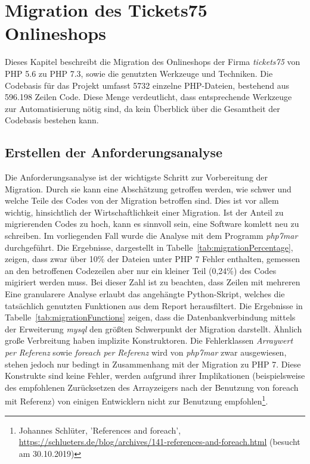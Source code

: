 \chapter{Migration des Tickets75 Onlineshops}\label{ch:migration} 

Dieses Kapitel beschreibt die Migration des Onlineshops der Firma \textit{tickets75} von \ac{PHP} 5.6 zu \ac{PHP} 7.3, sowie die 
genutzten Werkzeuge und Techniken. Die Codebasis 
für das Projekt umfasst 5732 einzelne \ac{PHP}-Dateien, bestehend aus 596.198 Zeilen Code. Diese Menge verdeutlicht, dass 
entsprechende Werkzeuge zur Automatisierung nötig sind, da kein Überblick über die Gesamtheit der Codebasis bestehen kann.

\section{Erstellen der Anforderungsanalyse}\label{analyze}
Die Anforderungsanalyse ist der wichtigste Schritt zur Vorbereitung der Migration. Durch sie kann eine Abschätzung getroffen werden, 
wie schwer und welche Teile des Codes von der Migration betroffen sind. Dies ist vor allem wichtig, hinsichtlich der 
Wirtschaftlichkeit einer Migration. Ist der Anteil zu migrierenden Codes zu hoch, kann es sinnvoll sein, eine Software 
komlett neu zu schreiben. Im vorliegenden Fall wurde die Analyse mit dem Programm \textit{php7mar} durchgeführt.
Die Ergebnisse, dargestellt in Tabelle~\ref{tab:migrationPercentage}, zeigen, dass zwar über 10\% der Dateien unter \ac{PHP} 7 
Fehler enthalten, gemessen an den betroffenen Codezeilen aber nur ein kleiner Teil (0,24\%) des Codes migiriert werden muss.
Bei dieser Zahl ist zu beachten, dass Zeilen mit mehreren 
Eine granularere Analyse erlaubt das angehängte Python-Skript, welches die tatsächlich genutzten Funktionen aus dem Report 
herausfiltert. Die Ergebnisse in Tabelle~\ref{tab:migrationFunctions} zeigen, dass die Datenbankverbindung mittels der 
Erweiterung \textit{mysql} den größten Schwerpunkt der Migration darstellt. Ähnlich große Verbreitung haben implizite 
Konstruktoren. Die Fehlerklassen \textit{Arraywert per Referenz} sowie \textit{foreach per Referenz} wird von \textit{php7mar} zwar ausgewiesen, stehen jedoch 
nur bedingt in Zusammenhang mit der Migration zu \ac{PHP} 7. Diese Konstrukte sind keine Fehler, werden aufgrund ihrer Implikationen (beispielsweise des empfohlenen 
Zurücksetzen des Arrayzeigers nach der Benutzung von foreach mit Referenz) von einigen Entwicklern nicht zur Benutzung empfohlen\footnote{Johannes Schlüter, 'References and foreach', \url{https://schlueters.de/blog/archives/141-references-and-foreach.html} (besucht am 30.10.2019)}.
